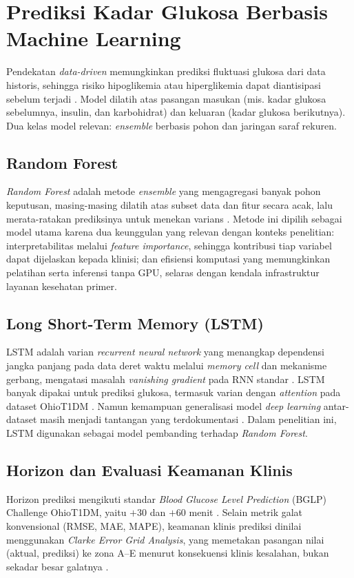 \section{Prediksi Kadar Glukosa Berbasis Machine Learning}
Pendekatan \emph{data-driven} memungkinkan prediksi fluktuasi glukosa dari data historis, sehingga risiko hipoglikemia atau hiperglikemia dapat diantisipasi sebelum terjadi \autocite{woldaregay2019}. Model dilatih atas pasangan masukan (mis. kadar glukosa sebelumnya, insulin, dan karbohidrat) dan keluaran (kadar glukosa berikutnya). Dua kelas model relevan: \emph{ensemble} berbasis pohon dan jaringan saraf rekuren.

\subsection{Random Forest}
\emph{Random Forest} adalah metode \emph{ensemble} yang mengagregasi banyak pohon keputusan, masing-masing dilatih atas subset data dan fitur secara acak, lalu merata-ratakan prediksinya untuk menekan varians \autocite{breiman2001}. Metode ini dipilih sebagai model utama karena dua keunggulan yang relevan dengan konteks penelitian: interpretabilitas melalui \emph{feature importance}, sehingga kontribusi tiap variabel dapat dijelaskan kepada klinisi; dan efisiensi komputasi yang memungkinkan pelatihan serta inferensi tanpa GPU, selaras dengan kendala infrastruktur layanan kesehatan primer.

\subsection{Long Short-Term Memory (LSTM)}
LSTM adalah varian \emph{recurrent neural network} yang menangkap dependensi jangka panjang pada data deret waktu melalui \emph{memory cell} dan mekanisme gerbang, mengatasi masalah \emph{vanishing gradient} pada RNN standar \autocite{hochreiter1997}. LSTM banyak dipakai untuk prediksi glukosa, termasuk varian dengan \emph{attention} pada dataset OhioT1DM \autocite{mirshekarian2019}. Namun kemampuan generalisasi model \emph{deep learning} antar-dataset masih menjadi tantangan yang terdokumentasi \autocite{ghimire2024}. Dalam penelitian ini, LSTM digunakan sebagai model pembanding terhadap \emph{Random Forest}.

\subsection{Horizon dan Evaluasi Keamanan Klinis}
Horizon prediksi mengikuti standar \emph{Blood Glucose Level Prediction} (BGLP) Challenge OhioT1DM, yaitu $+30$ dan $+60$ menit \autocite{marling2020}. Selain metrik galat konvensional (RMSE, MAE, MAPE), keamanan klinis prediksi dinilai menggunakan \emph{Clarke Error Grid Analysis}, yang memetakan pasangan nilai (aktual, prediksi) ke zona A--E menurut konsekuensi klinis kesalahan, bukan sekadar besar galatnya \autocite{clarke1987}.

